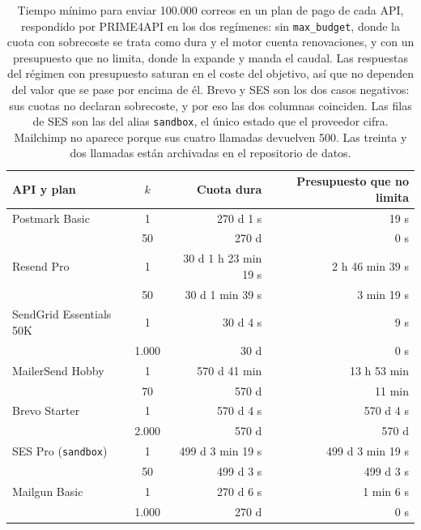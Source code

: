 \begin{table}[H]
\centering
\small
\begin{tabular}{|l|c|r|r|}
\hline
\textbf{API y plan} & \textbf{$k$} & \textbf{Cuota dura} & \textbf{Presupuesto que no limita} \\
\hline
Postmark Basic          & 1     & 270 d 1 s            & 19 s \\
                        & 50    & 270 d                & 0 s \\
\hline
Resend Pro              & 1     & 30 d 1 h 23 min 19 s & 2 h 46 min 39 s \\
                        & 50    & 30 d 1 min 39 s      & 3 min 19 s \\
\hline
SendGrid Essentials 50K & 1     & 30 d 4 s             & 9 s \\
                        & 1.000 & 30 d                 & 0 s \\
\hline
MailerSend Hobby        & 1     & 570 d 41 min         & 13 h 53 min \\
                        & 70    & 570 d                & 11 min \\
\hline
Brevo Starter           & 1     & 570 d 4 s            & 570 d 4 s \\
                        & 2.000 & 570 d                & 570 d \\
\hline
SES Pro (\texttt{sandbox}) & 1  & 499 d 3 min 19 s     & 499 d 3 min 19 s \\
                        & 50    & 499 d 3 s            & 499 d 3 s \\
\hline
Mailgun Basic           & 1     & 270 d 6 s            & 1 min 6 s \\
                        & 1.000 & 270 d                & 0 s \\
\hline
\end{tabular}
\caption[PI-A06 con la cuota dura y con presupuesto que no limita]{Tiempo mínimo para enviar 100.000 correos en un plan de pago de cada API, respondido por PRIME4API \citep{prime4apirepo} en los dos regímenes: sin \texttt{max\_budget}, donde la cuota con sobrecoste se trata como dura y el motor cuenta renovaciones, y con un presupuesto que no limita, donde la expande y manda el caudal. Las respuestas del régimen con presupuesto saturan en el coste del objetivo, así que no dependen del valor que se pase por encima de él. Brevo y SES son los dos casos negativos: sus cuotas no declaran sobrecoste, y por eso las dos columnas coinciden. Las filas de SES son las del alias \texttt{sandbox}, el único estado que el proveedor cifra. Mailchimp no aparece porque sus cuatro llamadas devuelven 500. Las treinta y dos llamadas están archivadas en el repositorio de datos.}
\label{tab:a06-presupuesto}
\end{table}
